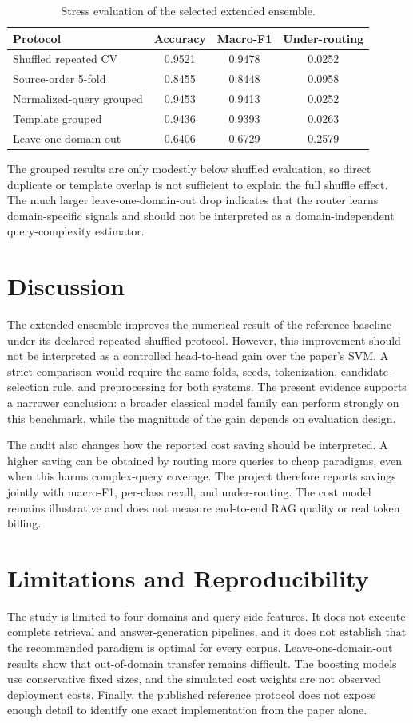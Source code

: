 \documentclass[conference]{IEEEtran}
\begin{document}
\begin{table}[t]
\centering
\small
\setlength{\tabcolsep}{2.5pt}
\caption{Stress evaluation of the selected extended ensemble.}
\label{tab:stress}
\begin{tabular}{lccc}
\toprule
Protocol & Accuracy & Macro-F1 & Under-routing \\
\midrule
Shuffled repeated CV & 0.9521 & 0.9478 & 0.0252 \\
Source-order 5-fold & 0.8455 & 0.8448 & 0.0958 \\
Normalized-query grouped & 0.9453 & 0.9413 & 0.0252 \\
Template grouped & 0.9436 & 0.9393 & 0.0263 \\
Leave-one-domain-out & 0.6406 & 0.6729 & 0.2579 \\
\bottomrule
\end{tabular}
\end{table}

The grouped results are only modestly below shuffled evaluation, so direct duplicate or template overlap is not sufficient to explain the full shuffle effect. The much larger leave-one-domain-out drop indicates that the router learns domain-specific signals and should not be interpreted as a domain-independent query-complexity estimator.

\section{Discussion}
The extended ensemble improves the numerical result of the reference baseline under its declared repeated shuffled protocol. However, this improvement should not be interpreted as a controlled head-to-head gain over the paper's SVM. A strict comparison would require the same folds, seeds, tokenization, candidate-selection rule, and preprocessing for both systems. The present evidence supports a narrower conclusion: a broader classical model family can perform strongly on this benchmark, while the magnitude of the gain depends on evaluation design.

The audit also changes how the reported cost saving should be interpreted. A higher saving can be obtained by routing more queries to cheap paradigms, even when this harms complex-query coverage. The project therefore reports savings jointly with macro-F1, per-class recall, and under-routing. The cost model remains illustrative and does not measure end-to-end RAG quality or real token billing.

\section{Limitations and Reproducibility}
The study is limited to four domains and query-side features. It does not execute complete retrieval and answer-generation pipelines, and it does not establish that the recommended paradigm is optimal for every corpus. Leave-one-domain-out results show that out-of-domain transfer remains difficult. The boosting models use conservative fixed sizes, and the simulated cost weights are not observed deployment costs. Finally, the published reference protocol does not expose enough detail to identify one exact implementation from the paper alone.
\end{document}
